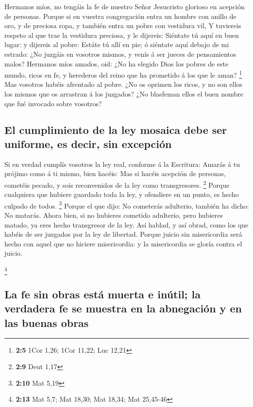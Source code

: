  Hermanos míos, no tengáis la fe de nuestro Señor Jesucristo
glorioso en acepción de personas.  Porque si en vuestra
congregación entra un hombre con anillo de oro, y de preciosa ropa, y
también entra un pobre con vestidura vil,  Y tuviereis
respeto al que trae la vestidura preciosa, y le dijereis: Siéntate tú
aquí en buen lugar: y dijereis al pobre: Estáte tú allí en pie; ó
siéntate aquí debajo de mi estrado:  ¿No juzgáis en vosotros
mismos, y venís á ser jueces de pensamientos malos? 
Hermanos míos amados, oid: ¿No ha elegido Dios los pobres de este mundo,
ricos en fe, y herederos del reino que ha prometido á los que le aman?
\footnote{\textbf{2:5} 1Cor 1,26; 1Cor 11,22; Luc 12,21} 
Mas vosotros habéis afrentado al pobre. ¿No os oprimen los ricos, y no
son ellos los mismos que os arrastran á los juzgados?  ¿No
blasfeman ellos el buen nombre que fué invocado sobre vosotros?

\hypertarget{el-cumplimiento-de-la-ley-mosaica-debe-ser-uniforme-es-decir-sin-excepciuxf3n}{%
\subsection{El cumplimiento de la ley mosaica debe ser uniforme, es
decir, sin
excepción}\label{el-cumplimiento-de-la-ley-mosaica-debe-ser-uniforme-es-decir-sin-excepciuxf3n}}

 Si en verdad cumplís vosotros la ley real, conforme á la
Escritura: Amarás á tu prójimo como á ti mismo, bien hacéis:
 Mas si hacéis acepción de personas, cometéis pecado, y sois
reconvenidos de la ley como transgresores. \footnote{\textbf{2:9} Deut
  1,17}  Porque cualquiera que hubiere guardado toda la
ley, y ofendiere en un punto, es hecho culpado de todos. \footnote{\textbf{2:10}
  Mat 5,19}  Porque el que dijo: No cometerás adulterio,
también ha dicho: No matarás. Ahora bien, si no hubieres cometido
adulterio, pero hubieres matado, ya eres hecho transgresor de la ley.
 Así hablad, y así obrad, como los que habéis de ser
juzgados por la ley de libertad.  Porque juicio sin
misericordia será hecho con aquel que no hiciere misericordia: y la
misericordia se gloría contra el juicio.

\footnote{\textbf{2:13} Mat 5,7; Mat 18,30; Mat 18,34; Mat 25,45-46}

\hypertarget{la-fe-sin-obras-estuxe1-muerta-e-inuxfatil-la-verdadera-fe-se-muestra-en-la-abnegaciuxf3n-y-en-las-buenas-obras}{%
\subsection{La fe sin obras está muerta e inútil; la verdadera fe se
muestra en la abnegación y en las buenas
obras}\label{la-fe-sin-obras-estuxe1-muerta-e-inuxfatil-la-verdadera-fe-se-muestra-en-la-abnegaciuxf3n-y-en-las-buenas-obras}}


